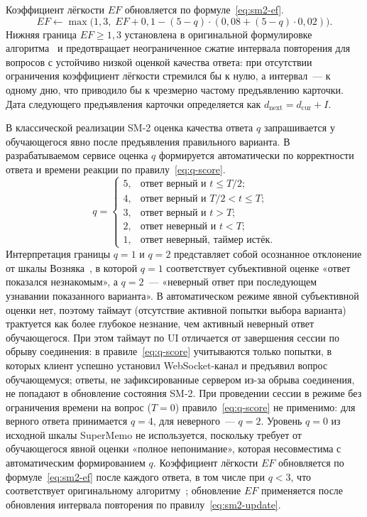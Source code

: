 Коэффициент лёгкости $EF$ обновляется по формуле~\eqref{eq:sm2-ef}.
\begin{equation}\label{eq:sm2-ef}
    EF \leftarrow \max\bigl(1{,}3,\; EF + 0{,}1 - (5 - q) \cdot (0{,}08 + (5 - q) \cdot 0{,}02)\bigr).
\end{equation}
Нижняя граница $EF \geq 1{,}3$ установлена в оригинальной
формулировке алгоритма~\cite{wozniak1990} и предотвращает
неограниченное сжатие интервала повторения для вопросов
с устойчиво низкой оценкой качества ответа: при отсутствии
ограничения коэффициент лёгкости стремился бы к нулю,
а интервал~--- к одному дню, что приводило бы к чрезмерно
частому предъявлению карточки. Дата следующего предъявления
карточки определяется как $d_{\text{next}} = d_{\text{cur}} + I$.

В классической реализации SM-2 оценка качества ответа $q$
запрашивается у обучающегося явно после предъявления правильного
варианта. В разрабатываемом сервисе оценка $q$ формируется
автоматически по корректности ответа и времени реакции
по правилу~\eqref{eq:q-score}.
\begin{equation}\label{eq:q-score}
    q =
    \begin{cases}
        5, & \text{ответ верный и } t \leq T/2; \\
        4, & \text{ответ верный и } T/2 < t \leq T; \\
        3, & \text{ответ верный и } t > T; \\
        2, & \text{ответ неверный и } t < T; \\
        1, & \text{ответ неверный, таймер истёк.}
    \end{cases}
\end{equation}
Интерпретация границы $q = 1$ и $q = 2$ представляет собой
осознанное отклонение от шкалы Возняка~\cite{wozniak1990}, в которой
$q = 1$ соответствует субъективной оценке «ответ показался
незнакомым», а $q = 2$~--- «неверный ответ при последующем
узнавании показанного варианта». В автоматическом режиме явной
субъективной оценки нет, поэтому таймаут (отсутствие активной
попытки выбора варианта) трактуется как более глубокое незнание,
чем активный неверный ответ обучающегося. При этом таймаут
по UI отличается от завершения сессии по обрыву соединения:
в правиле~\eqref{eq:q-score} учитываются только попытки, в которых
клиент успешно установил WebSocket-канал и предъявил вопрос
обучающемуся; ответы, не зафиксированные сервером из-за обрыва
соединения, не попадают в обновление состояния SM-2.
При проведении сессии в режиме без ограничения времени на вопрос
($T = 0$) правило~\eqref{eq:q-score} не применимо: для верного
ответа принимается $q = 4$, для неверного~--- $q = 2$. Уровень
$q = 0$ из исходной шкалы SuperMemo не используется, поскольку
требует от обучающегося явной оценки «полное непонимание», которая
несовместима с автоматическим формированием $q$. Коэффициент
лёгкости $EF$ обновляется по формуле~\eqref{eq:sm2-ef} после
каждого ответа, в том числе при $q < 3$, что соответствует
оригинальному алгоритму~\cite{wozniak1990}; обновление $EF$
применяется после обновления интервала повторения по
правилу~\eqref{eq:sm2-update}.

